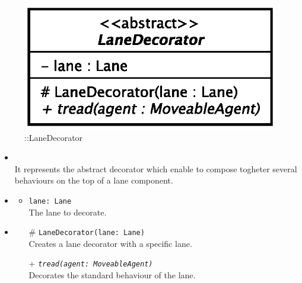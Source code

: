 \begin{figure}[h]
\centering
\includegraphics[scale=0.6,keepaspectratio]{images/solution/app/backend/lane_decorator.eps}
\caption{\pReactiveComponentLaneDecoration::LaneDecorator}
\label{fig:sd-app-lane_decorator}
\end{figure}
\FloatBarrier
\begin{itemize}
  \item \textbf{\descr} \\
    It represents the abstract decorator which enable to compose togheter several
behaviours on the top of a lane component. 
  \item \textbf{\attrs}
  \begin{itemize}
    \item \texttt{lane: Lane} \\
The lane to decorate.
  \end{itemize}
  \item \textbf{\ops}
   \begin{itemize} 
   \item[\#] \texttt{LaneDecorator(lane: Lane)} \\
Creates a lane decorator with a specific lane.
    \item[+] \texttt{\textit{tread(agent: MoveableAgent)}} \\
Decorates the standard behaviour of the lane.  
  \end{itemize}
\end{itemize}
